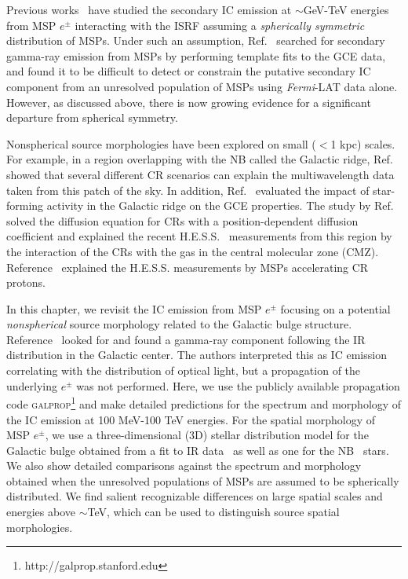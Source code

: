 \documentclass[doublespace,nopageskip]{VTthesis} %
\begin{document}
Previous works~\cite{2015ApJ...802..124Y,2015JCAP...02..023P} have studied the secondary IC emission at $\sim$GeV-TeV energies from MSP $e^\pm$ interacting with the ISRF assuming a \emph{spherically symmetric} distribution of MSPs. Under such an assumption, Ref.~\cite{2016PhRvD..93j3004L} searched for secondary gamma-ray emission from MSPs by performing template fits to the GCE data, and found it to be difficult to detect or constrain the putative secondary IC component from an unresolved population of MSPs using \textit{Fermi}-LAT data alone. However, as discussed above, there is now growing evidence for a significant departure from spherical symmetry.

Nonspherical source morphologies have been explored on small ($<$1 kpc) scales. For example, in a region overlapping with the NB called the Galactic ridge, Ref.~\cite{2015MNRAS.451.1833M} showed that several different CR scenarios can explain the multiwavelength data taken from this patch of the sky. In addition, Ref.~\cite{2016PhRvL.117k1101C} evaluated the impact of star-forming activity in the Galactic ridge on the GCE properties. The study by Ref.~\cite{2017PhRvL.119c1101G} solved the diffusion equation for CRs with a position-dependent diffusion coefficient and explained the recent H.E.S.S.~\cite{2016Natur.531..476H} measurements from this region by the interaction of the CRs with the gas in the central molecular zone (CMZ). Reference~\cite{2018JCAP...07..042G} explained the H.E.S.S. measurements by MSPs accelerating CR protons.

In this chapter, we revisit the IC emission from MSP $e^\pm$ focusing on a potential \emph{nonspherical} source morphology related to the Galactic bulge structure. Reference~\cite{2015JCAP...07..013A} looked for and found a gamma-ray component following the IR distribution in the Galactic center. The authors interpreted this as IC emission correlating with the distribution of optical light, but a propagation of the underlying $e^\pm$ was not performed. Here, we use the publicly available propagation code \textsc{galprop}\footnote{http://galprop.stanford.edu}\cite{2000ApJ...537..763S} and make detailed predictions for the spectrum and morphology of the IC emission at 100 MeV-100 TeV energies. For the spatial morphology of MSP $e^\pm$, we use a three-dimensional (3D) stellar distribution model for the Galactic bulge obtained from a fit to IR data~\cite{1998ApJ...492..495F} as well as one for the NB~\cite{2002A&A...384..112L} stars. We also show detailed comparisons against the spectrum and morphology obtained when the unresolved populations of MSPs are assumed to be spherically distributed. We find salient recognizable differences on large spatial scales and energies above $\sim$TeV, which can be used to distinguish source spatial morphologies.
\end{document}
